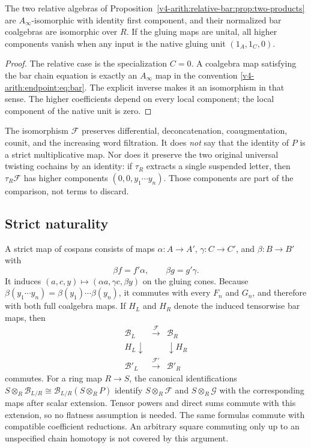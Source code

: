 \begin{corollary}\label{v4-arith:endpoint:cor:relative}
The two relative algebras of Proposition~\ref{v4-arith:relative-bar:prop:two-products} are $A_\infty$-isomorphic with identity first component, and their normalized bar coalgebras are isomorphic over $R$. If the gluing maps are unital, all higher components vanish when any input is the native gluing unit $(1_A,1_C,0)$.
\end{corollary}
\begin{proof}
The relative case is the specialization $C=0$. A coalgebra map satisfying the bar chain equation is exactly an $A_\infty$ map in the convention \eqref{v4-arith:endpoint:eq:bar}. The explicit inverse makes it an isomorphism in that sense. The higher coefficients depend on every local component; the local component of the native unit is zero.
\end{proof}

The isomorphism $\mathcal{F}$ preserves differential, deconcatenation, coaugmentation, counit, and the increasing word filtration. It does \emph{not} say that the identity of $P$ is a strict multiplicative map. Nor does it preserve the two original universal twisting cochains by an identity: if $\tau_R$ extracts a single suspended letter, then $\tau_R\mathcal{F}$ has higher components $(0,0,y_1\cdots y_n)$. Those components are part of the comparison, not terms to discard.

\subsection{Strict naturality}
A strict map of cospans consists of maps $\alpha:A\to A'$, $\gamma:C\to C'$, and $\beta:B\to B'$ with
\[
 \beta f=f'\alpha,\qquad \beta g=g'\gamma.
\]
It induces $(a,c,y)\mapsto(\alpha a,\gamma c,\beta y)$ on the gluing cones. Because $\beta(y_1\cdots y_n)=\beta(y_1)\cdots\beta(y_n)$, it commutes with every $F_n$ and $G_n$, and therefore with both full coalgebra maps. If $H_L$ and $H_R$ denote the induced tensorwise bar maps, then
\[
\begin{array}{ccc}
 \mathcal{B}_L &\xrightarrow{\mathcal{F}}&\mathcal{B}_R\\
 {\scriptstyle H_L}\downarrow &&\downarrow{\scriptstyle H_R}\\
 \mathcal{B}'_L&\xrightarrow{\mathcal{F}'}&\mathcal{B}'_R
\end{array}
\]
commutes. For a ring map $R\to S$, the canonical identifications
$S\otimes_R\mathcal{B}_{L/R}\cong\mathcal{B}_{L/R}(S\otimes_RP)$
identify $S\otimes_R\mathcal{F}$ and $S\otimes_R\mathcal{G}$ with
the corresponding maps after scalar extension. Tensor powers and direct
sums commute with this extension, so no flatness assumption is needed.
The same formulas commute with compatible coefficient reductions. An arbitrary square commuting only up to an unspecified chain homotopy is not covered by this argument.


